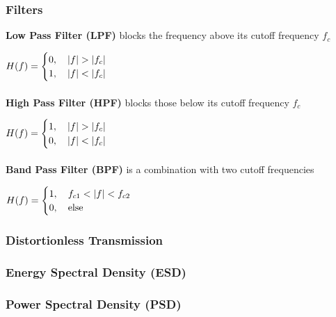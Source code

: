 \documentclass[11pt]{article}
\DeclarePairedDelimiter{\abs}{\lvert}{\rvert}
\begin{document}
\subsubsection{Filters}
\textbf{Low Pass Filter (LPF)} blocks the frequency above its  cutoff frequency $f_c$ \hfill \break
\par \quad 
$H(f) = \begin{cases}
    0, \quad \abs{f} > \abs{f_c} \\
    1, \quad \abs{f} < \abs{f_c}
\end{cases}$ \\ \\ \hfill \break
\textbf{High Pass Filter (HPF)} blocks those below its  cutoff frequency $f_c$ \hfill \break
\par \quad 
$H(f) = \begin{cases}
    1, \quad \abs{f} > \abs{f_c} \\
    0, \quad \abs{f} < \abs{f_c}
\end{cases}$ \\ \\ \hfill \break
\textbf{Band Pass Filter (BPF)} is a combination with two cutoff frequencies \hfill \break
\par \quad 
$H(f) = \begin{cases}
    1, \quad f_{c1} < \abs{f} < f_{c2} \\
    0, \quad \text{else}
\end{cases}$
\subsubsection{Distortionless Transmission}
\subsubsection{Energy Spectral Density (ESD)}
\subsubsection{Power Spectral Density (PSD)}
\end{document}
